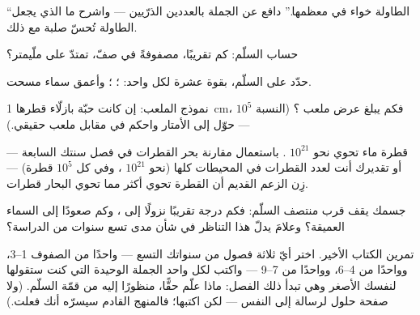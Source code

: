 \begin{exercise}[$\star$]\label{exo:g9:atoms-to-galaxies:6}
``الطاولة خواء في معظمها.'' دافع عن الجملة بالعددين الذرّيين
--- واشرح ما الذي يجعل الطاولة تُحسّ صلبة مع ذلك.
\end{exercise}

\begin{exercise}[$\star$]\label{exo:g9:atoms-to-galaxies:7}
حساب السلّم: كم  تقريبًا، مصفوفةً في صفّ، تمتدّ على
ملّيمتر؟
\end{exercise}

\begin{exercise}[$\star$]\label{exo:g9:atoms-to-galaxies:8}
حدّد على السلّم، بقوة عشرة لكل واحد: ؛ ؛ وأعمق سماء مسحت.
\end{exercise}

\begin{exercise}[$\star\star$]\label{exo:g9:atoms-to-galaxies:9}
نموذج الملعب: إن كانت  حبّة بازلّاء قطرها \qty{1}{cm}،
فكم يبلغ عرض ملعب ؟ (النسبة $10^{5}$ --- حوّل إلى
الأمتار واحكم في مقابل ملعب حقيقي.)
\end{exercise}

\begin{exercise}[$\star\star$]\label{exo:g9:atoms-to-galaxies:10}
قطرة ماء تحوي نحو $10^{21}$ . باستعمال مقارنة بحر القطرات
في فصل سنتك السابعة --- أو تقديرك أنت لعدد القطرات في
المحيطات كلها (نحو $10^{21}$ ، وفي كل  $10^{5}$ قطرة)
--- زِن الزعم القديم أن القطرة تحوي  أكثر مما تحوي
البحار قطرات.
\end{exercise}

\begin{exercise}[$\star\star$]\label{exo:g9:atoms-to-galaxies:11}
جسمك يقف قرب منتصف السلّم: فكم درجة تقريبًا نزولًا إلى ،
وكم صعودًا إلى السماء العميقة؟ وعلامَ يدلّ هذا التناظر في شأن
مدى تسع سنوات من الدراسة؟
\end{exercise}

\begin{exercise}[$\star\star\star$]\label{exo:g9:atoms-to-galaxies:12}
تمرين الكتاب الأخير. اختر أيّ ثلاثة فصول من سنواتك التسع ---
واحدًا من الصفوف 1--3، وواحدًا من 4--6، وواحدًا من 7--9 ---
واكتب لكل واحد الجملة الوحيدة التي كنت ستقولها لنفسك الأصغر
وهي تبدأ ذلك الفصل: ماذا علّم حقًّا، منظورًا إليه من قمّة
السلّم. (ولا صفحة حلول لرسالة إلى النفس --- لكن اكتبها؛
فالمنهج القادم سيسرّه أنك فعلت.)
\end{exercise}

